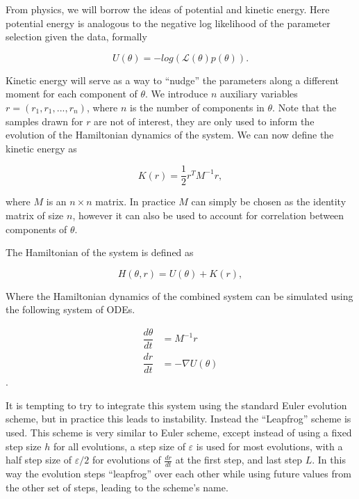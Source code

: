 \documentclass[12pt]{article}
\begin{document}
    From physics, we will borrow the ideas of potential and kinetic energy. Here potential energy is analogous to the negative log likelihood of the parameter selection given the data, formally

    \begin{equation}
        U(\theta) = -log(\mathcal{L}(\theta)p(\theta)).
    \end{equation}

    Kinetic energy will serve as a way to ``nudge'' the parameters along a different moment for each component of $\theta$. We introduce $n$ auxiliary variables $r = (r_1, r_1,...,r_n)$, where $n$ is the number of components in $\theta$. Note that the samples drawn for $r$ are not of interest, they are only used to inform the evolution of the Hamiltonian dynamics of the system. We can now define the kinetic energy as

    \begin{equation}
        K(r) = \frac{1}{2} r^T M^{-1} r,
    \end{equation}

    where $M$ is an $n \times n$ matrix. In practice $M$ can simply be chosen as the identity matrix of size $n$, however it can also be used to account for correlation between components of $\theta$.

    The Hamiltonian of the system is defined as

    \begin{equation}
        H(\theta,r) = U(\theta) + K(r),
    \end{equation}

    Where the Hamiltonian dynamics of the combined system can be simulated using the following system of ODEs.

    \begin{equation}
        \begin{array}{rl}
        \displaystyle
            \dfrac{d\theta}{dt} & = M^{-1} r \\
            \dfrac{dr}{dt} & = - \nabla U(\theta)
        \end{array}
    \end{equation}.

    It is tempting to try to integrate this system using the standard Euler evolution scheme, but in practice this leads to instability. Instead the ``Leapfrog'' scheme is used. This scheme is very similar to Euler scheme, except instead of using a fixed step size $h$ for all evolutions, a step size of $\varepsilon$ is used for most evolutions, with a half step size of $\varepsilon / 2$ for evolutions of $\frac{dr}{dt}$ at the first step, and last step $L$. In this way the evolution steps ``leapfrog'' over each other while using future values from the other set of steps, leading to the scheme's name.
\end{document}
